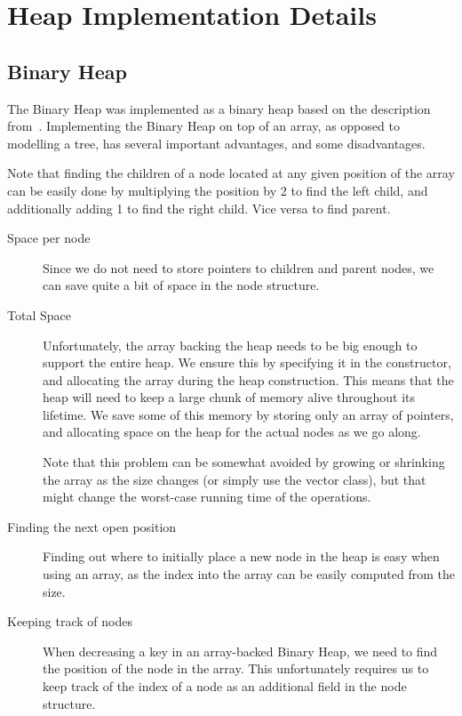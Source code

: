 \section{Heap Implementation Details}

\subsection{Binary Heap}

The Binary Heap was implemented as a binary heap based on the description from~\cite{AlgInC}.
Implementing the Binary Heap on top of an array, as opposed to modelling a tree, has several important advantages, and some disadvantages.

Note that finding the children of a node located at any given position of the array can be easily done by multiplying the position by 2 to find the left child, and additionally adding 1 to find the right child. Vice versa to find parent.

\begin{description}

\item[Space per node] Since we do not need to store pointers to children and parent nodes, we can save quite a bit of space in the node structure.

\item[Total Space] Unfortunately, the array backing the heap needs to be big enough to support the entire heap. We ensure this by specifying it in the constructor, and allocating the array during the heap construction. This means that the heap will need to keep a large chunk of memory alive throughout its lifetime. We save some of this memory by storing only an array of pointers, and allocating space on the heap for the actual nodes as we go along.

Note that this problem can be somewhat avoided by growing or shrinking the array as the size changes (or simply use the vector class), but that might change the worst-case running time of the operations.

\item[Finding the next open position] Finding out where to initially place a new node in the heap is easy when using an array, as the index into the array can be easily computed from the size.

\item[Keeping track of nodes] When decreasing a key in an array-backed Binary Heap, we need to find the position of the node in the array. This unfortunately requires us to keep track of the index of a node as an additional field in the node structure.

\end{description}

